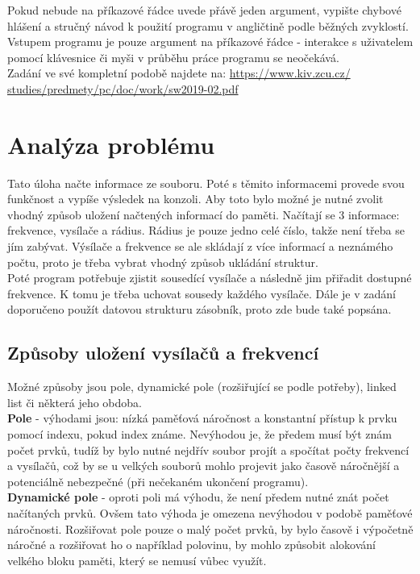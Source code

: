 \documentclass[12pt]{article}
\begin{document}
Pokud nebude na příkazové řádce uvede přávě jeden argument, vypište chybové
hlášení a stručný návod k použití programu v angličtině podle běžných 
zvyklostí. Vstupem programu je pouze argument na příkazové řádce - interakce
s uživatelem pomocí klávesnice či myši v průběhu práce programu se neočekává.\\

Zadání ve své kompletní podobě najdete na: \url{https://www.kiv.zcu.cz/
studies/predmety/pc/doc/work/sw2019-02.pdf}\\
%
%
\pagebreak
%
\section{Analýza problému}
%
Tato úloha načte informace ze souboru. Poté s těmito informacemi provede svou 
funkčnost a vypíše výsledek na konzoli. Aby toto bylo možné je nutné zvolit
vhodný způsob uložení načtených informací do paměti. Načítají se 3 informace: 
frekvence, vysílače a rádius. Rádius je pouze jedno celé číslo, takže není 
třeba se jím zabývat. Výsílače a frekvence se ale skládají z více informací 
a neznámého počtu, proto je třeba vybrat vhodný způsob ukládání struktur.\\

Poté program potřebuje zjistit sousedící vysílače a následně jim přiřadit 
dostupné frekvence. K tomu je třeba uchovat sousedy každého vysílače.
Dále je v zadání doporučeno použít datovou strukturu zásobník, proto zde bude
také popsána.
%
\subsection{Způsoby uložení vysílačů a frekvencí}
%
Možné způsoby jsou pole, dynamické pole (rozšiřující se podle potřeby), linked 
list či některá jeho obdoba.\\

\textbf{Pole} - výhodami jsou: nízká paměťová náročnost a konstantní přístup
k prvku pomocí indexu, pokud index známe. Nevýhodou je, že předem musí být 
znám počet prvků, tudíž by bylo nutné nejdřív soubor projít a spočítat počty 
frekvencí a vysílačů, což by se u velkých souborů mohlo projevit jako časově 
náročnější a potenciálně nebezpečné (při nečekaném ukončení programu).\\

\textbf{Dynamické pole} - oproti poli má výhodu, že není předem nutné znát 
počet načítaných prvků. Ovšem tato výhoda je omezena nevýhodou v podobě 
paměťové náročnosti. Rozšiřovat pole pouze o malý počet prvků, by bylo 
časově i výpočetně náročné a rozšiřovat ho o například polovinu, by mohlo 
způsobit alokování velkého bloku paměti, který se nemusí vůbec využít.\\
\end{document}
